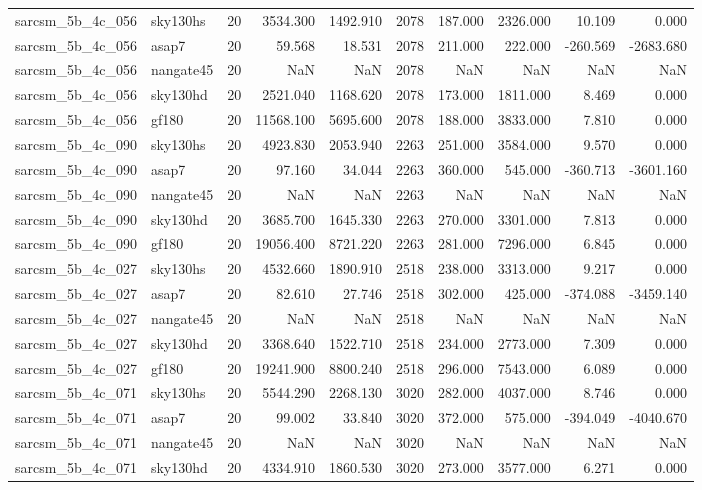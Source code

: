 \begin{tabular}{llrrrrrrrr}
sarcsm\_5b\_4c\_056 & sky130hs & 20 & 3534.300 & 1492.910 & 2078 & 187.000 & 2326.000 & 10.109 & 0.000 \\
sarcsm\_5b\_4c\_056 & asap7 & 20 & 59.568 & 18.531 & 2078 & 211.000 & 222.000 & -260.569 & -2683.680 \\
sarcsm\_5b\_4c\_056 & nangate45 & 20 & NaN & NaN & 2078 & NaN & NaN & NaN & NaN \\
sarcsm\_5b\_4c\_056 & sky130hd & 20 & 2521.040 & 1168.620 & 2078 & 173.000 & 1811.000 & 8.469 & 0.000 \\
sarcsm\_5b\_4c\_056 & gf180 & 20 & 11568.100 & 5695.600 & 2078 & 188.000 & 3833.000 & 7.810 & 0.000 \\
sarcsm\_5b\_4c\_090 & sky130hs & 20 & 4923.830 & 2053.940 & 2263 & 251.000 & 3584.000 & 9.570 & 0.000 \\
sarcsm\_5b\_4c\_090 & asap7 & 20 & 97.160 & 34.044 & 2263 & 360.000 & 545.000 & -360.713 & -3601.160 \\
sarcsm\_5b\_4c\_090 & nangate45 & 20 & NaN & NaN & 2263 & NaN & NaN & NaN & NaN \\
sarcsm\_5b\_4c\_090 & sky130hd & 20 & 3685.700 & 1645.330 & 2263 & 270.000 & 3301.000 & 7.813 & 0.000 \\
sarcsm\_5b\_4c\_090 & gf180 & 20 & 19056.400 & 8721.220 & 2263 & 281.000 & 7296.000 & 6.845 & 0.000 \\
sarcsm\_5b\_4c\_027 & sky130hs & 20 & 4532.660 & 1890.910 & 2518 & 238.000 & 3313.000 & 9.217 & 0.000 \\
sarcsm\_5b\_4c\_027 & asap7 & 20 & 82.610 & 27.746 & 2518 & 302.000 & 425.000 & -374.088 & -3459.140 \\
sarcsm\_5b\_4c\_027 & nangate45 & 20 & NaN & NaN & 2518 & NaN & NaN & NaN & NaN \\
sarcsm\_5b\_4c\_027 & sky130hd & 20 & 3368.640 & 1522.710 & 2518 & 234.000 & 2773.000 & 7.309 & 0.000 \\
sarcsm\_5b\_4c\_027 & gf180 & 20 & 19241.900 & 8800.240 & 2518 & 296.000 & 7543.000 & 6.089 & 0.000 \\
sarcsm\_5b\_4c\_071 & sky130hs & 20 & 5544.290 & 2268.130 & 3020 & 282.000 & 4037.000 & 8.746 & 0.000 \\
sarcsm\_5b\_4c\_071 & asap7 & 20 & 99.002 & 33.840 & 3020 & 372.000 & 575.000 & -394.049 & -4040.670 \\
sarcsm\_5b\_4c\_071 & nangate45 & 20 & NaN & NaN & 3020 & NaN & NaN & NaN & NaN \\
sarcsm\_5b\_4c\_071 & sky130hd & 20 & 4334.910 & 1860.530 & 3020 & 273.000 & 3577.000 & 6.271 & 0.000 \\

\end{tabular}
